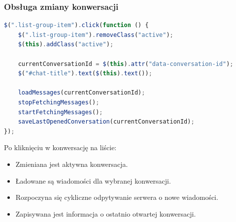 \documentclass[12pt,a4paper,oneside]{article}
\theoremstyle{definition}
\numberwithin{equation}{section}
\begin{document}
\subsubsection*{ Obsługa zmiany konwersacji}
\begin{lstlisting}[language=JavaScript, caption=Obsługa zmiany konwersacji]
$(".list-group-item").click(function () {
    $(".list-group-item").removeClass("active");
    $(this).addClass("active");

    currentConversationId = $(this).attr("data-conversation-id");
    $("#chat-title").text($(this).text());

    loadMessages(currentConversationId);
    stopFetchingMessages();
    startFetchingMessages();
    saveLastOpenedConversation(currentConversationId);
});
\end{lstlisting}
Po kliknięciu w konwersację na liście:
\begin{itemize}
    \item Zmieniana jest aktywna konwersacja.
    \item Ładowane są wiadomości dla wybranej konwersacji.
    \item Rozpoczyna się cykliczne odpytywanie serwera o nowe wiadomości.
    \item Zapisywana jest informacja o ostatnio otwartej konwersacji.
\end{itemize}
\end{document}
